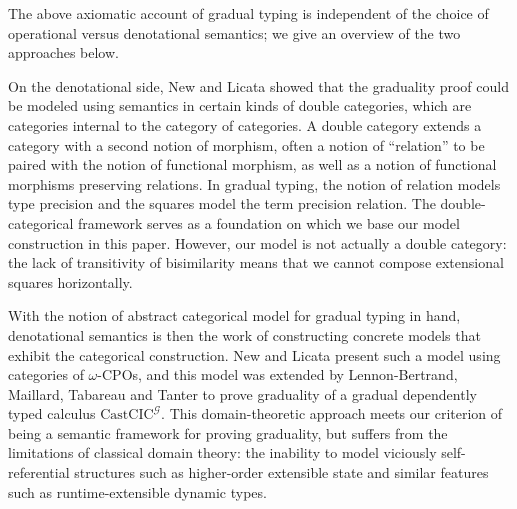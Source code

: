 

The above axiomatic account of gradual typing is independent of the choice of
operational versus denotational semantics; we give an overview of the two
approaches below.


On the denotational side, New and Licata \cite{new-licata18} showed that the
graduality proof could be modeled using semantics in certain kinds of double
categories, which are categories internal to the category of categories. A
double category extends a category with a second notion of morphism, often a
notion of ``relation'' to be paired with the notion of functional morphism, as
well as a notion of functional morphisms preserving relations. In gradual
typing, the notion of relation models type precision and the squares model the
term precision relation.
%
%
The double-categorical framework serves as a foundation on which we base our
model construction in this paper. However, our model is not actually a double
category: the lack of transitivity of bisimilarity means that we cannot compose
extensional squares horizontally.

With the notion of abstract categorical model for gradual typing in hand,
denotational semantics is then the work of constructing concrete models that
exhibit the categorical construction. New and Licata \cite{new-licata18} present
such a model using categories of $\omega$-CPOs, and this model was extended by
Lennon-Bertrand, Maillard, Tabareau and Tanter \cite{gradualizing-cic} to prove
graduality of a gradual dependently typed calculus $\textrm{CastCIC}^{\mathcal
G}$. This domain-theoretic approach meets our criterion of being a semantic
framework for proving graduality, but suffers from the limitations of classical
domain theory: the inability to model viciously self-referential structures such
as higher-order extensible state and similar features such as runtime-extensible
dynamic types.

